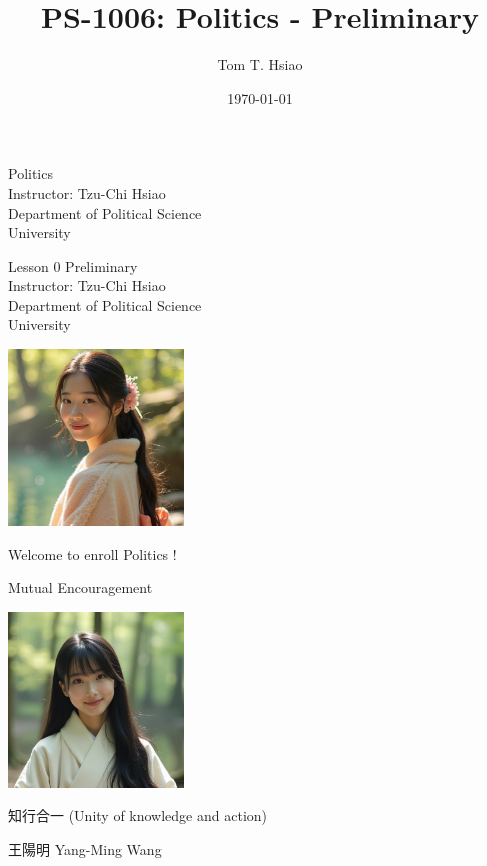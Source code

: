 \documentclass{beamer}
\title{PS-1006: Politics - Preliminary}
\author{Tom T. Hsiao}
\date{\today}
\begin{document}
\begin{frame}
\begin{center}
\Large{Politics} \\
\vspace{3em}
\normalsize{Instructor: Tzu-Chi Hsiao} \\
\vspace{3em}
\small{Department of Political Science} \\
\vspace{1em}
\small{University} \\
\end{center}
\end{frame}
\begin{frame}
\begin{center}
\Large{Lesson 0 Preliminary} \\
\vspace{3em}
\normalsize{Instructor: Tzu-Chi Hsiao} \\
\vspace{3em}
\small{Department of Political Science} \\
\vspace{1em}
\small{University} \\
\end{center}
\end{frame}
\begin{frame}{}
\begin{center}
\includegraphics[width=0.35\textwidth]{instructor.png}
\end{center}
\vspace{1em}
\begin{center}
\large{Welcome to enroll Politics !} \\
\end{center}
\end{frame}
\begin{frame}{Mutual Encouragement}
\begin{center}
\includegraphics[width=0.35\textwidth]{mc.png}
\end{center}
\begin{center}
知行合一 (Unity of knowledge and action)
\end{center}
\flushright 王陽明 Yang-Ming Wang
\end{frame}
\end{document}
